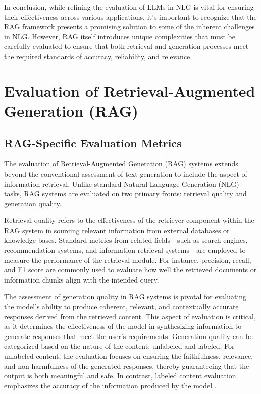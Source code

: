 In conclusion, while refining the evaluation of LLMs in NLG is vital for ensuring their effectiveness across various applications, it’s important to recognize that the RAG framework presents a promising solution to some of the inherent challenges in NLG. However, RAG itself introduces unique complexities that must be carefully evaluated to ensure that both retrieval and generation processes meet the required standards of accuracy, reliability, and relevance.

\section{Evaluation of Retrieval-Augmented Generation (RAG)}

\subsection{RAG-Specific Evaluation Metrics}

The evaluation of Retrieval-Augmented Generation (RAG) systems extends beyond the conventional assessment of text generation to include the aspect of information retrieval. Unlike standard Natural Language Generation (NLG) tasks, RAG systems are evaluated on two primary fronts: retrieval quality and generation quality. 

Retrieval quality refers to the effectiveness of the retriever component within the RAG system in sourcing relevant information from external databases or knowledge bases. Standard metrics from related fields—such as search engines, recommendation systems, and information retrieval systems—are employed to measure the performance of the retrieval module. For instance, precision, recall, and F1 score are commonly used to evaluate how well the retrieved documents or information chunks align with the intended query.

The assessment of generation quality in RAG systems is pivotal for evaluating the model’s ability to produce coherent, relevant, and contextually accurate responses derived from the retrieved content. This aspect of evaluation is critical, as it determines the effectiveness of the model in synthesizing information to generate responses that meet the user's requirements. Generation quality can be categorized based on the nature of the content: unlabeled and labeled. For unlabeled content, the evaluation focuses on ensuring the faithfulness, relevance, and non-harmfulness of the generated responses, thereby guaranteeing that the output is both meaningful and safe. In contrast, labeled content evaluation emphasizes the accuracy of the information produced by the model \cite{gao2023retrieval}.

